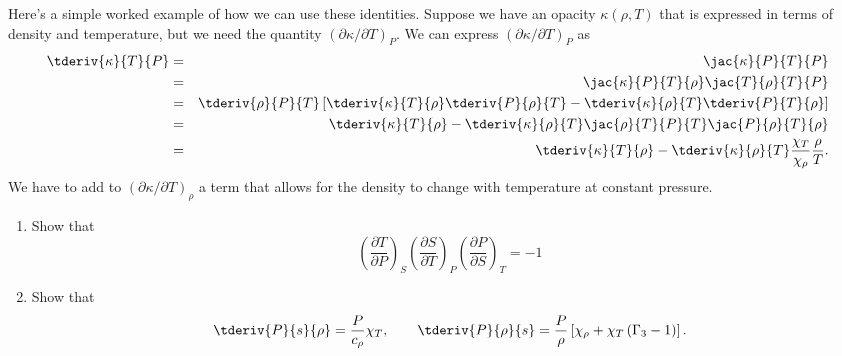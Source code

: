Here's a simple worked example of how we can use these identities.  Suppose we have an opacity $\kappa(\rho,T)$ that is expressed in terms of density and temperature, but we need the quantity $(\partial \kappa/\partial T)_{P}$. We can express $(\partial\kappa/\partial T)_{P}$ as
\begin{eqnarray}
\tderiv{\kappa}{T}{P} &=& \jac{\kappa}{P}{T}{P}\nonumber\\
 &=& \jac{\kappa}{P}{T}{\rho}\jac{T}{\rho}{T}{P}\nonumber\\
 &=& \tderiv{\rho}{P}{T}\left[\tderiv{\kappa}{T}{\rho}\tderiv{P}{\rho}{T}-\tderiv{\kappa}{\rho}{T}\tderiv{P}{T}{\rho}\right]
 \nonumber\\
 &=& \tderiv{\kappa}{T}{\rho} - \tderiv{\kappa}{\rho}{T}\jac{\rho}{T}{P}{T}\jac{P}{\rho}{T}{\rho}\nonumber\\
 &=& \tderiv{\kappa}{T}{\rho} - \tderiv{\kappa}{\rho}{T} \frac{\chi_{T}}{\chi_{\rho}}\frac{\rho}{T}.
\end{eqnarray}
We have to add to $(\partial \kappa/\partial T)_{\rho}$ a term that allows for the density to change with temperature at constant pressure.

\begin{exercisebox}
\begin{enumerate}
\item Show that 
\[
 	\left(\frac{\partial T}{\partial P}\right)_{S} 
 	\left(\frac{\partial S}{\partial T}\right)_{P} 
 	\left(\frac{\partial P}{\partial S}\right)_{T} = -1
\]

\item \label{ex.gamma-trans} Show that
\[ 
\tderiv{P}{s}{\rho} = \frac{P}{c_{\rho}}\chi_{T},\qquad \tderiv{P}{\rho}{s} = \frac{P}{\rho}\left[\chi_{\rho} + \chi_{T}\left(\Gamma_{3}-1\right)\right].
\]
\end{enumerate}
\end{exercisebox}
